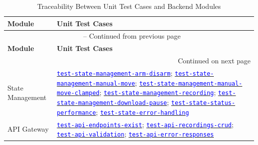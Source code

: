 \documentclass[12pt, titlepage]{article}
\newcommand{\tid}[1]{\hyperlink{tid:#1}{\textcolor{blue}{\texttt{#1}}}}
\begin{document}
\small
\begin{longtable}{|p{4.5cm}|p{10cm}|}
  \caption{Traceability Between Unit Test Cases and Backend Modules} \label{TblUTM-Backend}                                                                                                                                                                                                                                   \\
  \hline
  \textbf{Module}                 & \textbf{Unit Test Cases}                                                                                                                                                                                                                                                                  \\
  \hline
  \endfirsthead
  \multicolumn{2}{c}{\tablename\ \thetable{} -- Continued from previous page}                                                                                                                                                                                                                                                 \\
  \hline
  \textbf{Module}                 & \textbf{Unit Test Cases}                                                                                                                                                                                                                                                                  \\
  \hline
  \endhead
  \hline
  \multicolumn{2}{r}{Continued on next page}                                                                                                                                                                                                                                                                                  \\
  \endfoot
  \hline
  \endlastfoot
  State Management                & \tid{test-state-management-arm-disarm}; \tid{test-state-management-manual-move}; \tid{test-state-management-manual-move-clamped}; \tid{test-state-management-recording}; \tid{test-state-management-download-pause}; \tid{test-state-status-performance}; \tid{test-state-error-handling} \\
  \hline
  API Gateway                     & \tid{test-api-endpoints-exist}; \tid{test-api-recordings-crud}; \tid{test-api-validation}; \tid{test-api-error-responses}                                                                                                                                                                 \\

\end{longtable}
\end{document}
